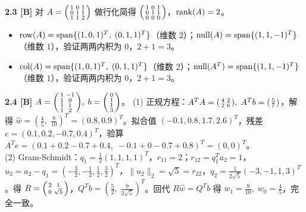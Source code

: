 \textbf{2.3 [B]}
对 $A = \begin{psmallmatrix}1&0&1\\0&1&1\\1&1&2\end{psmallmatrix}$ 做行化简得 $\begin{psmallmatrix}1&0&1\\0&1&1\\0&0&0\end{psmallmatrix}$，$\operatorname{rank}(A)=2$。
\begin{itemize}
  \item $\operatorname{row}(A) = \operatorname{span}\{(1,0,1)^T,\; (0,1,1)^T\}$（维数 $2$）；$\operatorname{null}(A) = \operatorname{span}\{(1,1,-1)^T\}$（维数 $1$），验证两两内积为 $0$，$2+1=3$。
  \item $\operatorname{col}(A) = \operatorname{span}\{(1,0,1)^T,\; (0,1,1)^T\}$（维数 $2$）；$\operatorname{null}(A^T) = \operatorname{span}\{(1,1,-1)^T\}$（维数 $1$），验证两两内积为 $0$，$2+1=3$。
\end{itemize}

\textbf{2.4 [B]}
$A = \begin{psmallmatrix}1&-1\\1&0\\1&1\\1&2\end{psmallmatrix},\; b=\begin{psmallmatrix}0\\1\\1\\3\end{psmallmatrix}$。
(1) 正规方程：$A^TA = \begin{psmallmatrix}4&2\\2&6\end{psmallmatrix},\; A^Tb = \begin{psmallmatrix}5\\7\end{psmallmatrix}$，解得 $\hat{w} = (\frac{4}{5},\; \frac{9}{10})^T = (0.8, 0.9)^T$。拟合值 $(-0.1, 0.8, 1.7, 2.6)^T$，残差 $e = (0.1, 0.2, -0.7, 0.4)^T$，验算 $A^T e = (0.1+0.2-0.7+0.4,\; -0.1+0-0.7+0.8)^T = (0,0)^T$。\\
(2) Gram-Schmidt：$q_1 = \frac{1}{2}(1,1,1,1)^T$，$r_{11}=2$；$r_{12} = q_1^T a_2 = 1$，$u_2 = a_2 - q_1 = (-\frac{3}{2},-\frac{1}{2},\frac{1}{2},\frac{3}{2})^T$，$\|u_2\|_2 = \sqrt{5} = r_{22}$，$q_2 = \frac{1}{2\sqrt{5}}(-3,-1,1,3)^T$。得 $R = \begin{psmallmatrix}2&1\\0&\sqrt{5}\end{psmallmatrix}$，$Q^T b = (\frac{5}{2},\; \frac{9}{2\sqrt{5}})^T$。回代 $R\hat{w} = Q^T b$ 得 $w_1 = \frac{9}{10},\; w_0 = \frac{4}{5}$，完全一致。

